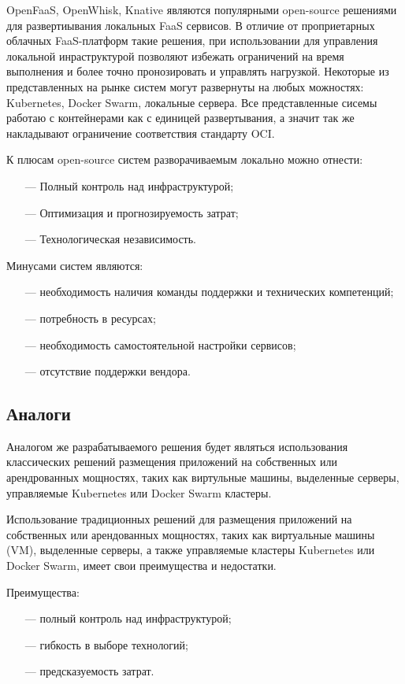 OpenFaaS, OpenWhisk, Knative являются популярными open-source\cite{bretthauer2001open} решениями для развертиывания локальных FaaS сервисов. В отличие от проприетарных облачных FaaS-платформ такие решения, при использовании для управления локальной инраструктурой позволяют избежать ограничений на время выполнения и более точно пронозировать и управлять нагрузкой. Некоторые из представленных на рынке систем могут развернуты на любых можностях: Kubernetes, Docker Swarm, локальные сервера. Все представленные сисемы работаю с контейнерами как с единицей развертывания, а значит так же накладывают ограничение соответствия стандарту OCI.

К плюсам open-source систем разворачиваемым локально можно отнести:
\begin{itemize}
    \item[---]Полный контроль над инфраструктурой;
    \item[---]Оптимизация и прогнозируемость затрат;
    \item[---]Технологическая независимость.
\end{itemize}
    
Минусами систем являются:
\begin{itemize}
    \item[---]необходимость наличия команды поддержки и технических компетенций;
    \item[---]потребность в ресурсах;
    \item[---]необходимость самостоятельной настройки сервисов;
    \item[---]отсутствие поддержки вендора.
\end{itemize}

\subsection{Аналоги}

Аналогом же разрабатываемого решения будет являться использования классических решений размещения приложений на собственных или арендрованных мощностях, таких как виртульные машины, выделенные серверы, управляемые Kubernetes или Docker Swarm кластеры.

Использование традиционных решений для размещения приложений на собственных или арендованных мощностях, таких как виртуальные машины (VM), выделенные серверы, а также управляемые кластеры Kubernetes или Docker Swarm, имеет свои преимущества и недостатки.

Преимущества:
\begin{itemize}
    \item[---]полный контроль над инфраструктурой;
    \item[---]гибкость в выборе технологий;
    \item[---]предсказуемость затрат.
\end{itemize}

